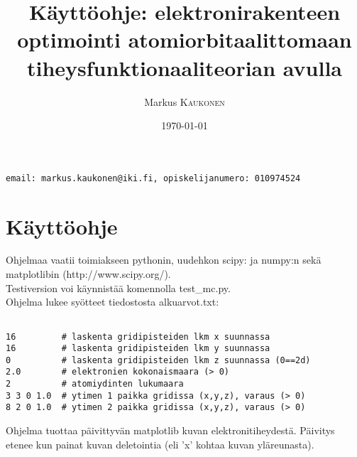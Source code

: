 \documentclass{article}
\title{Käyttöohje: elektronirakenteen optimointi atomiorbitaalittomaan tiheysfunktionaaliteorian avulla} %
\author{Markus \textsc{Kaukonen} %
}
\date{\today} %
\begin{document}
\maketitle %
\hspace{1cm} \texttt{email: markus.kaukonen@iki.fi, opiskelijanumero: 010974524}

\newpage


\section{Käyttöohje}
Ohjelmaa vaatii toimiakseen pythonin, uudehkon scipy: ja numpy:n sekä matplotlibin (http://www.scipy.org/). \\

Testiversion voi käynnistää komennolla test\_mc.py.\\

Ohjelma lukee syötteet tiedostosta alkuarvot.txt:\\
\begin{small}
\begin{lstlisting}[frame=single]  % Start your code-block

16         # laskenta gridipisteiden lkm x suunnassa 
16         # laskenta gridipisteiden lkm y suunnassa 
0          # laskenta gridipisteiden lkm z suunnassa (0==2d)
2.0        # elektronien kokonaismaara (> 0)
2          # atomiydinten lukumaara
3 3 0 1.0  # ytimen 1 paikka gridissa (x,y,z), varaus (> 0)
8 2 0 1.0  # ytimen 2 paikka gridissa (x,y,z), varaus (> 0)
\end{lstlisting}
\end{small}
Ohjelma tuottaa päivittyvän matplotlib kuvan elektronitiheydestä. Päivitys etenee kun painat kuvan deletointia (eli 'x' kohtaa kuvan yläreunasta).

\end{document}
